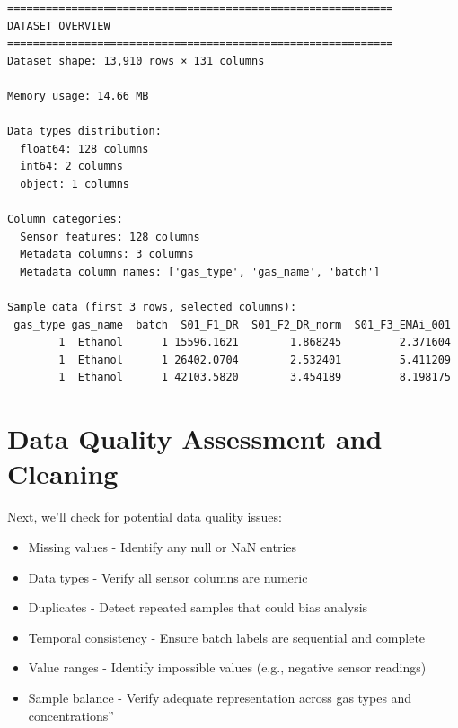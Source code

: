 \documentclass[
  letterpaper,
  DIV=11,
  numbers=noendperiod]{scrartcl}
\providecommand{\tightlist}{%
  \setlength{\itemsep}{0pt}\setlength{\parskip}{0pt}}
\begin{document}
\begin{verbatim}
============================================================
DATASET OVERVIEW
============================================================
Dataset shape: 13,910 rows × 131 columns

Memory usage: 14.66 MB

Data types distribution:
  float64: 128 columns
  int64: 2 columns
  object: 1 columns

Column categories:
  Sensor features: 128 columns
  Metadata columns: 3 columns
  Metadata column names: ['gas_type', 'gas_name', 'batch']

Sample data (first 3 rows, selected columns):
 gas_type gas_name  batch  S01_F1_DR  S01_F2_DR_norm  S01_F3_EMAi_001
        1  Ethanol      1 15596.1621        1.868245         2.371604
        1  Ethanol      1 26402.0704        2.532401         5.411209
        1  Ethanol      1 42103.5820        3.454189         8.198175
\end{verbatim}

\section{Data Quality Assessment and
Cleaning}\label{data-quality-assessment-and-cleaning}

Next, we'll check for potential data quality issues:

\begin{itemize}
\tightlist
\item
  Missing values - Identify any null or NaN entries
\item
  Data types - Verify all sensor columns are numeric
\item
  Duplicates - Detect repeated samples that could bias analysis
\item
  Temporal consistency - Ensure batch labels are sequential and complete
\item
  Value ranges - Identify impossible values (e.g., negative sensor
  readings)
\item
  Sample balance - Verify adequate representation across gas types and
  concentrations''
\end{itemize}
\end{document}
